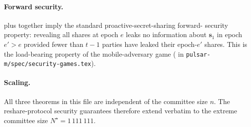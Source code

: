 \paragraph{Forward security.}
 plus 
together imply the standard proactive-secret-sharing forward-
security property: revealing all shares at epoch $e$ leaks no
information about $\mathbf{s}_1$ in epoch $e' > e$ provided fewer
than $t-1$ parties have leaked their epoch-$e'$ shares. This is
the load-bearing property of the mobile-adversary game
( in \texttt{pulsar-m/spec/security-games.tex}).

\paragraph{Scaling.}
All three theorems in this file are independent of the committee
size $n$. The reshare-protocol security guarantees therefore
extend verbatim to the extreme committee size $N^\star =
1\,111\,111$.

